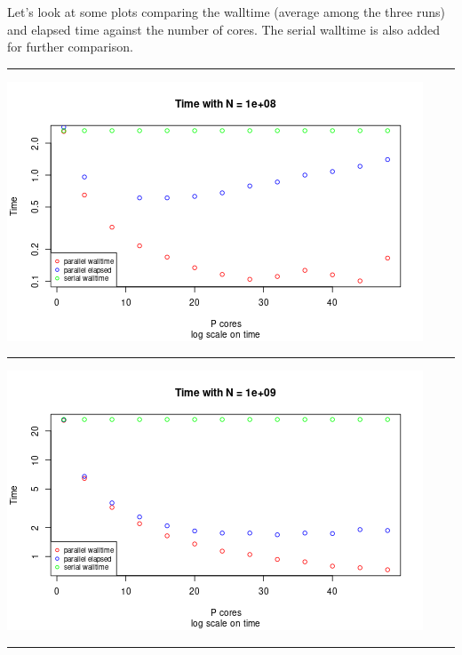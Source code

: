 \documentclass[
  10pt,
]{article}
\begin{document}
Let's look at some plots comparing the walltime (average among the three
runs) and elapsed time against the number of cores. The serial walltime
is also added for further comparison.

\begin{center}\rule{0.5\linewidth}{0.5pt}\end{center}

\begin{center}\includegraphics{figs/ss_time-1} \end{center}

\begin{center}\rule{0.5\linewidth}{0.5pt}\end{center}

\begin{center}\includegraphics{figs/ss_time-2} \end{center}

\begin{center}\rule{0.5\linewidth}{0.5pt}\end{center}
\end{document}
